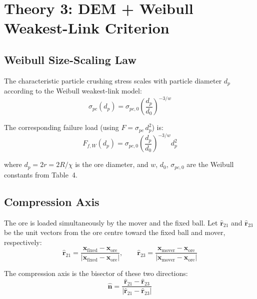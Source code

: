 \documentclass{article}
\begin{document}
\section{Theory 3: DEM + Weibull Weakest-Link Criterion}
\label{sec:weibull}

\subsection{Weibull Size-Scaling Law}

The characteristic particle crushing stress scales with particle diameter $d_p$
according to the Weibull weakest-link model:
\begin{equation}
    \sigma_{pc}(d_p) = \sigma_{pc,0} \left(\frac{d_p}{d_0}\right)^{-3/w}
\end{equation}

The corresponding failure load (using $F = \sigma_{pc}\,d_p^2$) is:
\begin{equation}
    F_{f,W}(d_p) = \sigma_{pc,0} \left(\frac{d_p}{d_0}\right)^{-3/w} d_p^2
\end{equation}

where $d_p = 2r = 2R/\chi$ is the ore diameter, and $w$, $d_0$, $\sigma_{pc,0}$
are the Weibull constants from Table~4.

\subsection{Compression Axis}

The ore is loaded simultaneously by the mover and the fixed ball.
Let $\hat{\mathbf{r}}_{21}$ and $\hat{\mathbf{r}}_{23}$ be the unit vectors from
the ore centre toward the fixed ball and mover, respectively:
\begin{equation}
    \hat{\mathbf{r}}_{21} = \frac{\mathbf{x}_{\text{fixed}} - \mathbf{x}_{\text{ore}}}
                                  {|\mathbf{x}_{\text{fixed}} - \mathbf{x}_{\text{ore}}|},
    \qquad
    \hat{\mathbf{r}}_{23} = \frac{\mathbf{x}_{\text{mover}} - \mathbf{x}_{\text{ore}}}
                                  {|\mathbf{x}_{\text{mover}} - \mathbf{x}_{\text{ore}}|}
\end{equation}

The compression axis is the bisector of these two directions:
\begin{equation}
    \hat{\mathbf{n}} = \frac{\hat{\mathbf{r}}_{21} - \hat{\mathbf{r}}_{23}}
                            {|\hat{\mathbf{r}}_{21} - \hat{\mathbf{r}}_{23}|}
\end{equation}
\end{document}
